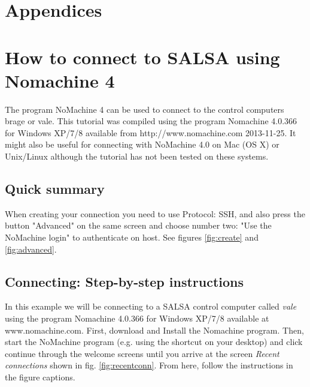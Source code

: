 \chapter*{Appendices}

\appendix

\chapter{How to connect to SALSA using Nomachine 4}
\label{app:nomachine}
The program NoMachine 4 can be used to connect to the control computers brage or vale.
This tutorial was compiled using the program Nomachine 4.0.366 for Windows XP/7/8 available
from http://www.nomachine.com 2013-11-25. It might also be useful for connecting with 
NoMachine 4.0 on Mac (OS X) or Unix/Linux although the tutorial has not been tested on these systems.

\section{Quick summary}
When creating your connection you need to use Protocol: SSH, and also press the
button "Advanced" on the same screen and choose number two: "Use the NoMachine
login" to authenticate on host. See figures \ref{fig:create} and
\ref{fig:advanced}. 

\section{Connecting: Step-by-step instructions}
In this example we will be connecting to a SALSA control computer called
\emph{vale} using the program Nomachine 4.0.366 for Windows XP/7/8 available at
www.nomachine.com. First, download and Install the Nomachine program. Then,
start the NoMachine program (e.g. using the shortcut on your desktop) and click
continue through the welcome screens until you arrive at the screen
\emph{Recent connections} shown in fig. \ref{fig:recentconn}. From here, follow
the instructions in the figure captions.

